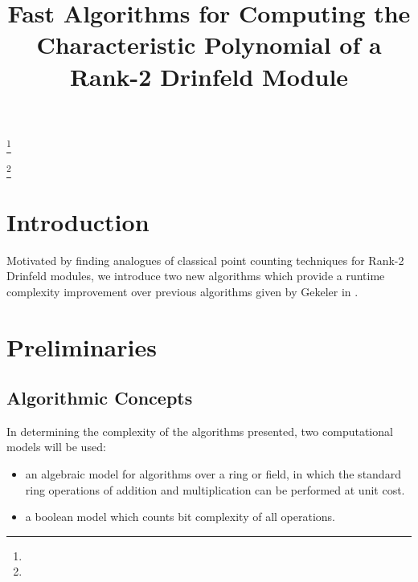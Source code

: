 \documentclass{jams-l}
\theoremstyle{remark}
\numberwithin{equation}{section}
\begin{document}
\title[AMS Article Template]{Fast Algorithms for Computing the Characteristic Polynomial of a Rank-2 Drinfeld Module}


\author{}
\address{}
\curraddr{}
\email{}
\thanks{}

\author{}
\address{}
\curraddr{}
\email{}
\thanks{}


\date{}

\dedicatory{}

\begin{abstract}
\end{abstract}

\maketitle


\section{Introduction}

Motivated by finding analogues of classical point counting techniques for Rank-2 Drinfeld modules, we introduce two new algorithms which provide a runtime complexity improvement over previous algorithms given by Gekeler in .

\section{Preliminaries}

\subsection{Algorithmic Concepts}

In determining the complexity of the algorithms presented, two computational models will be used:

\begin{itemize}
\item an algebraic model for algorithms over a ring or field, in which the standard ring operations of addition and multiplication can be performed at unit cost.

\item a boolean model which counts bit complexity of all operations.
\end{itemize}
\end{document}
